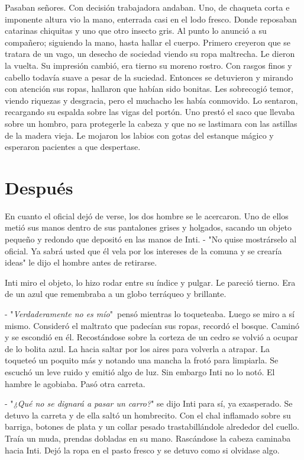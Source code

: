 Pasaban señores. Con decisión trabajadora andaban. Uno, de chaqueta corta e imponente altura vio la mano, enterrada casi en el lodo fresco. Donde reposaban catarinas chiquitas y uno que otro insecto gris. Al punto lo anunció a su compañero; siguiendo la mano, hasta hallar el cuerpo. Primero creyeron que se tratara de un vago, un desecho de sociedad viendo su ropa maltrecha. Le dieron la vuelta. Su impresión cambió, era tierno su moreno rostro. Con rasgos finos y cabello todavía suave a pesar de la suciedad. Entonces se detuvieron y mirando con atención sus ropas, hallaron que habían sido bonitas. Les sobrecogió temor, viendo riquezas y desgracia, pero el muchacho les había conmovido. Lo sentaron, recargando su espalda sobre las vigas del portón. Uno prestó el saco que llevaba sobre un hombro, para protegerle la cabeza y que no se lastimara con las astillas de la madera vieja. Le mojaron los labios con gotas del estanque mágico y esperaron pacientes a que despertase.



\chapter{Después}
En cuanto el oficial dejó de verse, los dos hombre se le acercaron. Uno de ellos metió sus manos dentro de sus pantalones grises y holgados, sacando un objeto pequeño y redondo que depositó en las manos de Inti.
- "No quise mostrárselo al oficial. Ya sabrá usted que él vela por los intereses de la comuna y se crearía ideas" le dijo el hombre antes de retirarse.

Inti miro el objeto, lo hizo rodar entre su índice y pulgar. Le pareció tierno. Era de un azul que remembraba a un globo terráqueo y brillante.

- "\emph{Verdaderamente no es mío}"\, pensó mientras lo toqueteaba. Luego se miro a sí mismo. Consideró el maltrato que padecían sus ropas, recordó el bosque. Caminó y se escondió en él. Recostándose sobre la corteza de un cedro se volvió a ocupar de lo bolita azul. La hacia saltar por los aires para volverla a atrapar. La toqueteó un poquito más y notando una mancha la frotó para limpiarla. Se escuchó un leve ruido y emitió algo de luz. Sin embargo Inti no lo notó. El hambre le agobiaba. Pasó otra carreta.

- "\emph{¿Qué no se dignará a pasar un carro?}" se dijo Inti para sí, ya exasperado. Se detuvo la carreta y de ella saltó un hombrecito. Con el chal inflamado sobre su barriga, botones de plata y un collar pesado trastabillándole alrededor del cuello. Traía un muda, prendas dobladas en su mano. Rascándose la cabeza caminaba hacia Inti. Dejó la ropa en el pasto fresco y se detuvo como si olvidase algo.

